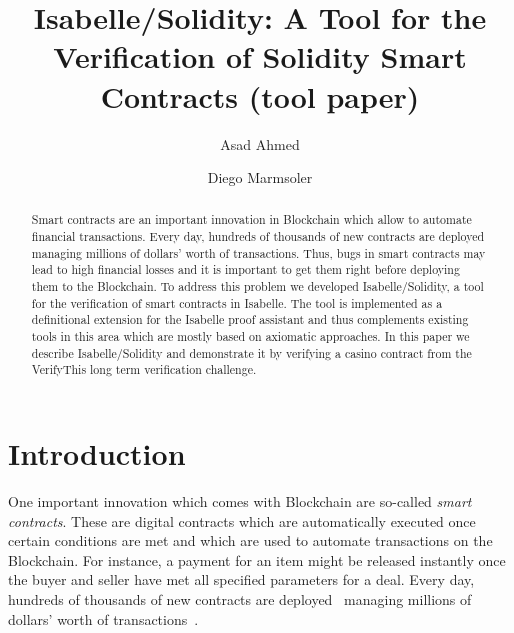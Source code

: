 \documentclass[a4paper,UKenglish,cleveref, autoref, thm-restate]{oasics-v2021}
\title{Isabelle/Solidity: A Tool  for the Verification of Solidity Smart Contracts (tool paper)} %
\author{Asad {Ahmed}}{University of Exeter, Exeter EX4 4PY, UK \and \url{https://sites.google.com/view/asad-ahmed/home} }{a.ahmed6@exeter.ac.uk}{https://orcid.org/0000-0001-8276-0975}{}%
\author{Diego Marmsoler}{University of Exeter, Exeter EX4 4PY, UK}{d.marmsoler@exeter.ac.uk}{[https://orcid.org/0000-0003-2859-7673]}{}
\begin{document}
\maketitle

\begin{abstract}
	Smart contracts are an important innovation in Blockchain which allow to automate financial transactions.
	Every day, hundreds of thousands of new contracts are deployed managing millions of dollars' worth of transactions.
	Thus, bugs in smart contracts may lead to high financial losses and it is important to get them right before deploying them to the Blockchain.
	To address this problem we developed Isabelle/Solidity, a tool for the verification of smart contracts in Isabelle.
	The tool is implemented as a definitional extension for the Isabelle proof assistant and thus complements existing tools in this area which are mostly based on axiomatic approaches.
	In this paper we describe Isabelle/Solidity and demonstrate it by verifying a casino contract from the VerifyThis long term verification challenge.
\end{abstract}

\section{Introduction}
\label{sec-intro}
One important innovation which comes with Blockchain are so-called \emph{smart contracts}.
These are digital contracts which are automatically executed once certain conditions are met and which are used to automate transactions on the Blockchain.
For instance, a payment for an item might be released instantly once the buyer and seller have met all specified parameters for a deal.
Every day, hundreds of thousands of new contracts are deployed~\cite{etherscan:contracts} managing millions of dollars' worth of transactions~\cite{ycharts:transactions}.
\end{document}
